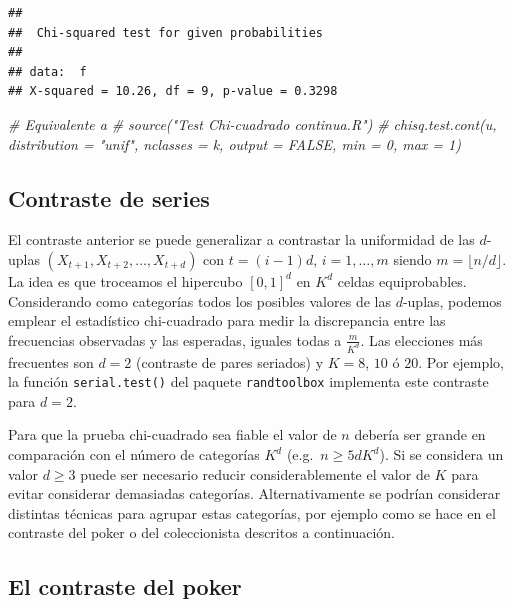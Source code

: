 \documentclass[
]{book}
\newenvironment{Shaded}{\begin{snugshade}}{\end{snugshade}}
\newcommand{\CommentTok}[1]{\textcolor[rgb]{0.56,0.35,0.01}{\textit{#1}}}
\theoremstyle{break}
\theoremstyle{definition}
\theoremstyle{definition}
\theoremstyle{definition}
\theoremstyle{definition}
\theoremstyle{remark}
\begin{document}
\begin{verbatim}
## 
##  Chi-squared test for given probabilities
## 
## data:  f
## X-squared = 10.26, df = 9, p-value = 0.3298
\end{verbatim}

\begin{Shaded}
\begin{Highlighting}[]
\CommentTok{\# Equivalente a}
\CommentTok{\# source("Test Chi{-}cuadrado continua.R")  }
\CommentTok{\# chisq.test.cont(u, distribution = "unif", nclasses = k, output = FALSE, min = 0, max = 1)}
\end{Highlighting}
\end{Shaded}

\hypertarget{contraste-de-series}{%
\subsection{Contraste de series}\label{contraste-de-series}}

El contraste anterior se puede generalizar a contrastar la uniformidad de las \(d\)-uplas \((X_{t+1},X_{t+2},\ldots,X_{t+d})\) con \(t=(i-1)d\), \(i=1,\ldots,m\) siendo \(m=\lfloor n/d \rfloor\).
La idea es que troceamos el hipercubo \([0, 1]^d\) en \(K^d\) celdas equiprobables.
Considerando como categorías todos los posibles valores de las \(d\)-uplas, podemos emplear el estadístico chi-cuadrado para medir la discrepancia entre las frecuencias observadas y las esperadas, iguales todas a \(\frac{m}{K^d}\).
Las elecciones más frecuentes son \(d=2\) (contraste de pares seriados) y \(K=8\), \(10\) ó \(20\).
Por ejemplo, la función \texttt{serial.test()} del paquete \texttt{randtoolbox} implementa este contraste para \(d=2\).

Para que la prueba chi-cuadrado sea fiable el valor de \(n\) debería ser grande en comparación con el número de categorías \(K^d\) (e.g.~\(n \geq 5dK^d\)).
Si se considera un valor \(d \geq 3\) puede ser necesario reducir considerablemente el valor de \(K\) para evitar considerar demasiadas categorías.
Alternativamente se podrían considerar distintas técnicas para agrupar estas categorías, por ejemplo como se hace en el contraste del poker o del coleccionista descritos a continuación.

\hypertarget{el-contraste-del-poker}{%
\subsection{El contraste del poker}\label{el-contraste-del-poker}}
\end{document}
